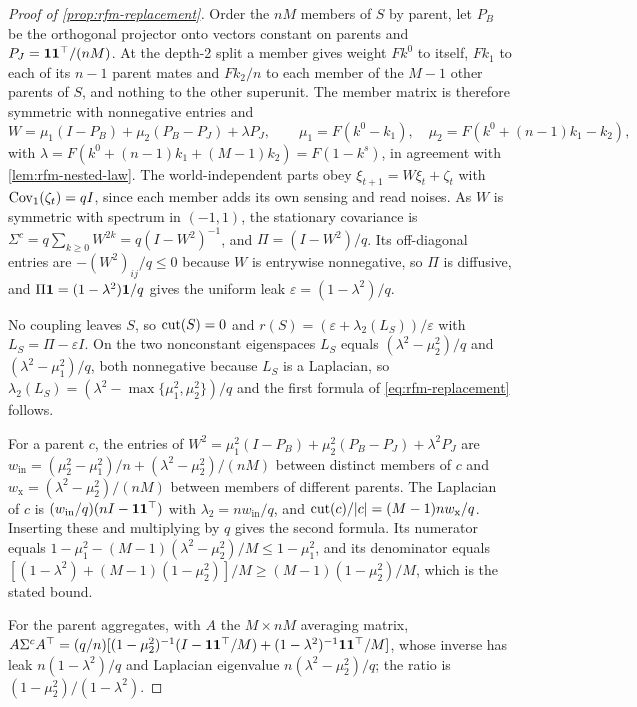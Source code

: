\begin{proof}[Proof of \cref{prop:rfm-replacement}]
Order the $nM$ members of $S$ by parent, let $P_B$ be the orthogonal projector onto vectors constant on parents and $P_J=\mathbf{1}\mathbf{1}^\top/(nM)$. At the depth-2 split a member gives weight $Fk^0$ to itself, $Fk_1$ to each of its $n-1$ parent mates and $Fk_2/n$ to each member of the $M-1$ other parents of $S$, and nothing to the other superunit. The member matrix is therefore symmetric with nonnegative entries and
\begin{equation*}
W=\mu_1(I-P_B)+\mu_2(P_B-P_J)+\lambda P_J,\qquad\mu_1=F(k^0-k_1),\quad\mu_2=F(k^0+(n-1)k_1-k_2),
\end{equation*}
with $\lambda=F(k^0+(n-1)k_1+(M-1)k_2)=F(1-k^s)$, in agreement with \cref{lem:rfm-nested-law}. The world-independent parts obey $\xi_{t+1}=W\xi_t+\zeta_t$ with $\operatorname{Cov}_1(\zeta_t)=qI$, since each member adds its own sensing and read noises. As $W$ is symmetric with spectrum in $(-1,1)$, the stationary covariance is $\Sigma^c=q\sum_{k\ge0}W^{2k}=q(I-W^2)^{-1}$, and $\Pi=(I-W^2)/q$. Its off-diagonal entries are $-(W^2)_{ij}/q\le0$ because $W$ is entrywise nonnegative, so $\Pi$ is diffusive, and $\Pi\mathbf{1}=(1-\lambda^2)\mathbf{1}/q$ gives the uniform leak $\varepsilon=(1-\lambda^2)/q$.

No coupling leaves $S$, so $\operatorname{cut}(S)=0$ and $r(S)=(\varepsilon+\lambda_2(L_S))/\varepsilon$ with $L_S=\Pi-\varepsilon I$. On the two nonconstant eigenspaces $L_S$ equals $(\lambda^2-\mu_2^2)/q$ and $(\lambda^2-\mu_1^2)/q$, both nonnegative because $L_S$ is a Laplacian, so $\lambda_2(L_S)=(\lambda^2-\max\{\mu_1^2,\mu_2^2\})/q$ and the first formula of \eqref{eq:rfm-replacement} follows.

For a parent $c$, the entries of $W^2=\mu_1^2(I-P_B)+\mu_2^2(P_B-P_J)+\lambda^2P_J$ are $w_{\mathrm{in}}=(\mu_2^2-\mu_1^2)/n+(\lambda^2-\mu_2^2)/(nM)$ between distinct members of $c$ and $w_{\mathrm x}=(\lambda^2-\mu_2^2)/(nM)$ between members of different parents. The Laplacian of $c$ is $(w_{\mathrm{in}}/q)(nI-\mathbf{1}\mathbf{1}^\top)$ with $\lambda_2=nw_{\mathrm{in}}/q$, and $\operatorname{cut}(c)/|c|=(M-1)nw_{\mathrm x}/q$. Inserting these and multiplying by $q$ gives the second formula. Its numerator equals $1-\mu_1^2-(M-1)(\lambda^2-\mu_2^2)/M\le1-\mu_1^2$, and its denominator equals $[(1-\lambda^2)+(M-1)(1-\mu_2^2)]/M\ge(M-1)(1-\mu_2^2)/M$, which is the stated bound.

For the parent aggregates, with $A$ the $M\times nM$ averaging matrix, $A\Sigma^cA^\top=(q/n)[(1-\mu_2^2)^{-1}(I-\mathbf{1}\mathbf{1}^\top/M)+(1-\lambda^2)^{-1}\mathbf{1}\mathbf{1}^\top/M]$, whose inverse has leak $n(1-\lambda^2)/q$ and Laplacian eigenvalue $n(\lambda^2-\mu_2^2)/q$; the ratio is $(1-\mu_2^2)/(1-\lambda^2)$.
\end{proof}

